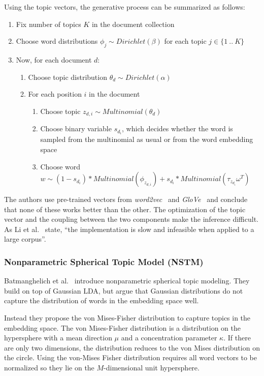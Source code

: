\documentclass[
        a4paper,
        titlepage,
        twoside,
        parskip
        ]{scrbook}
\theoremstyle{break}
\begin{document}
Using the topic vectors, the generative process can be summarized as follows:
\begin{enumerate}
    \item Fix number of topics $K$ in the document collection
    \item Choose word distributions $\phi_j \sim Dirichlet(\beta)$ for each topic $j \in \{1~..~K\}$
    \item Now, for each document $d$:
    \begin{enumerate}
        \item Choose topic distribution $\theta_d \sim Dirichlet(\alpha)$
        \item For each position $i$ in the document
        \begin{enumerate}
            \item Choose topic $z_{d,i} \sim Multinomial(\theta_d)$
            \item Choose binary variable $s_{d_i}$, which decides whether the word is sampled from the multinomial as usual or from the word embedding space
            \item Choose word $w \sim (1 - s_{d_i}) * Multinomial(\phi_{z_{d,i}}) + s_{d_i} * Multinomial(\tau_{z_{d_{i}}} \omega^T)$
        \end{enumerate}
    \end{enumerate}
\end{enumerate}
The authors use pre-trained vectors from \emph{word2vec}~\cite{Mikolov2013a} and \emph{GloVe}~\cite{Pennington2014} and conclude that none of these works better than the other.
The optimization of the topic vector and the coupling between the two components make the inference difficult.
As Li et al.~\cite{Li2016} state, ``the implementation is slow and infeasible when applied to a large corpus''.

\subsubsection{Nonparametric Spherical Topic Model (NSTM)}
Batmanghelich et al.~\cite{Batmanghelich2016} introduce nonparametric spherical topic modeling.
They build on top of Gaussian LDA, but argue that Gaussian distributions do not capture the distribution of words in the embedding space well.


Instead they propose the von Mises-Fisher distribution to capture topics in the embedding space.
The von Mises-Fisher distribution is a distribution on the hypersphere with a mean direction $\mu$ and a concentration parameter $\kappa$.
If there are only two dimensions, the distribution reduces to the von Mises distribution on the circle.
Using the von-Mises Fisher distribution requires all word vectors to be normalized so they lie on the $M$-dimensional unit hypersphere.
\end{document}
